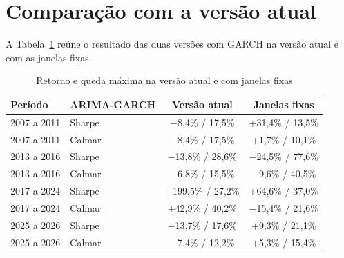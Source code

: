 \section{Comparação com a versão atual}
\label{sec:comparacao-j}

A Tabela~\ref{tab:comparacao-j} reúne o resultado das duas versões com GARCH na
versão atual e com as janelas fixas.

\begin{table}[htbp]
\centering
\caption{Retorno e queda máxima na versão atual e com janelas fixas}
\label{tab:comparacao-j}
\fontsize{10}{12}\selectfont
\begin{tabular}{l|l|c|c}
\hline
Período & ARIMA-GARCH & Versão atual & Janelas fixas \\
\hline
2007 a 2011 & Sharpe & $-$8,4\% / 17,5\% & +31,4\% / 13,5\% \\
\hline
2007 a 2011 & Calmar & $-$8,4\% / 17,5\% & +1,7\% / 10,1\% \\
\hline
2013 a 2016 & Sharpe & $-$13,8\% / 28,6\% & $-$24,5\% / 77,6\% \\
\hline
2013 a 2016 & Calmar & $-$6,8\% / 15,5\% & $-$9,6\% / 40,5\% \\
\hline
2017 a 2024 & Sharpe & +199,5\% / 27,2\% & +64,6\% / 37,0\% \\
\hline
2017 a 2024 & Calmar & +42,9\% / 40,2\% & $-$15,4\% / 21,6\% \\
\hline
2025 a 2026 & Sharpe & $-$13,7\% / 17,6\% & +9,3\% / 21,1\% \\
\hline
2025 a 2026 & Calmar & $-$7,4\% / 12,2\% & +5,3\% / 15,4\% \\
\hline
\end{tabular}
\end{table}

